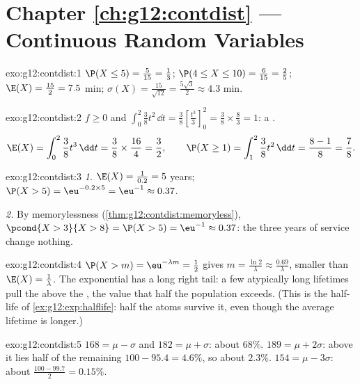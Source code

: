 \section*{Chapter \ref{ch:g12:contdist} --- Continuous Random Variables}

\begin{solution}{exo:g12:contdist:1}
$\P(X \leq 5) = \frac{5}{15} = \frac13$;
$\P(4 \leq X \leq 10) = \frac{6}{15} = \frac25$;
$\E(X) = \frac{15}{2} = 7.5$ min;
$\sigma(X) = \frac{15}{\sqrt{12}} = \frac{5\sqrt3}{2} \approx 4.3$ min.
\end{solution}

\begin{solution}{exo:g12:contdist:2}
$f \geq 0$ and
$\int_0^2 \frac38 t^2\,\dd t = \frac38\left[\frac{t^3}{3}\right]_0^2
= \frac38 \times \frac83 = 1$: a .
\[
\E(X) = \int_0^2 \frac38 t^3\,\dd t = \frac38 \times \frac{16}{4} = \frac32,
\qquad
\P(X \geq 1) = \int_1^2 \frac38 t^2\,\dd t = \frac{8 - 1}{8} = \frac78 .
\]
\end{solution}

\begin{solution}{exo:g12:contdist:3}
\emph{1.} $\E(X) = \frac{1}{0.2} = 5$ years;
$\P(X > 5) = \eu^{-0.2\times5} = \eu^{-1} \approx 0.37$.

\emph{2.} By memorylessness (\cref{thm:g12:contdist:memoryless}),
$\pcond{X > 3}{X > 8} = \P(X > 5) = \eu^{-1} \approx 0.37$: the three years
of service change nothing.
\end{solution}

\begin{solution}{exo:g12:contdist:4}
$\P(X > m) = \eu^{-\lambda m} = \frac12$ gives
$m = \frac{\ln 2}{\lambda} \approx \frac{0.69}{\lambda}$, smaller than
$\E(X) = \frac1\lambda$. The exponential  has a long right tail: a
few atypically long lifetimes pull the \emph{} above the
\emph{}, the value that half the population exceeds. (This is the
half-life of \cref{ex:g12:exp:halflife}: half the atoms survive it, even
though the average lifetime is longer.)
\end{solution}

\begin{solution}{exo:g12:contdist:5}
$168 = \mu - \sigma$ and $182 = \mu + \sigma$: about $68\%$.
$189 = \mu + 2\sigma$: above it lies half of the remaining
$100 - 95.4 = 4.6\%$, so about $2.3\%$.
$154 = \mu - 3\sigma$: about $\frac{100 - 99.7}{2} = 0.15\%$.
\end{solution}

